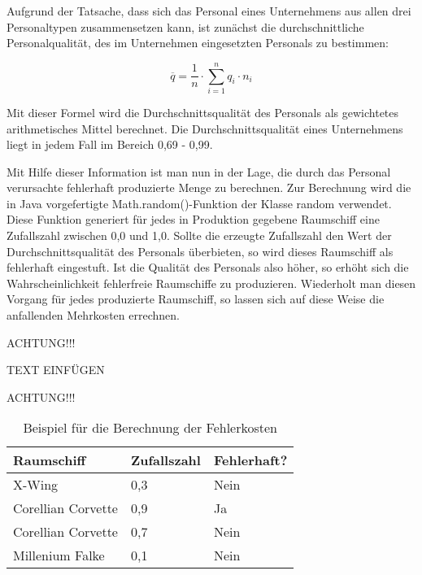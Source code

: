 Aufgrund der Tatsache, dass sich das Personal eines Unternehmens aus allen drei Personaltypen
zusammensetzen kann, ist zunächst die durchschnittliche Personalqualität, des im Unternehmen
eingesetzten Personals zu bestimmen:

\begin{equation}
     \overline{q} = \frac{1}{n} \cdot \sum\limits_{i=1}^n {q_i \cdot n_i}
     \label{alg:spielwelt-logik-fehlerkosten-1}
\end{equation}

Mit dieser Formel wird die Durchschnittsqualität des Personals als gewichtetes arithmetisches Mittel
berechnet. Die Durchschnittsqualität eines Unternehmens liegt in jedem Fall im Bereich 0,69 - 0,99.

Mit Hilfe dieser Information ist man nun in der Lage, die durch das Personal verursachte fehlerhaft
produzierte Menge zu berechnen. Zur Berechnung wird die in Java vorgefertigte Math.random()-Funktion
der Klasse random verwendet. Diese Funktion generiert für jedes in Produktion gegebene Raumschiff eine
Zufallszahl zwischen 0,0 und 1,0. Sollte die erzeugte Zufallszahl den Wert der Durchschnittsqualität
des Personals überbieten, so wird dieses Raumschiff als fehlerhaft eingestuft. Ist die Qualität des
Personals also höher, so erhöht sich die Wahrscheinlichkeit fehlerfreie Raumschiffe zu produzieren.
Wiederholt man diesen Vorgang für jedes produzierte Raumschiff, so lassen sich auf diese Weise die
anfallenden Mehrkosten errechnen.

ACHTUNG!!!

TEXT EINFÜGEN

ACHTUNG!!!

\begin{table}[ht]
     \centering
     \begin{tabular}{ | l | l | l | }
          \hline
          Raumschiff & Zufallszahl & Fehlerhaft? \\
          \hline \hline
          X-Wing & 0,3 & Nein \\ \hline
          Corellian Corvette & 0,9 & Ja \\ \hline
          Corellian Corvette & 0,7 & Nein \\ \hline
          Millenium Falke & 0,1 & Nein \\ \hline
     \end{tabular}
     \caption{Beispiel für die Berechnung der Fehlerkosten}
     \label{tab:spielwelt-logik-fehlerkosten-beispiel}
\end{table}

